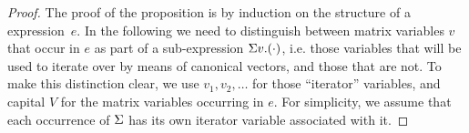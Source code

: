 
\begin{proof}
%
%
%
%
%
The proof of the proposition is by induction on the structure of a \langsum expression~$e$. In the following we need to distinguish between matrix variables $v$
that occur in $e$ as part of a sub-expression $\Sigma v. (\cdot)$, i.e. those variables that will be used to iterate over by means of canonical vectors, and those that are not. To make this distinction clear, we use $v_1,v_2,\ldots$ for those ``iterator'' variables, and capital $V$ for the matrix variables occurring in $e$. For simplicity, we assume that each occurrence of $\Sigma$ has its own iterator variable associated with it. 


\end{proof}
